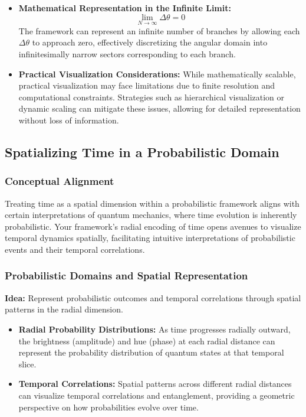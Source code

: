 \documentclass[12pt]{article}
\begin{document}
\begin{enumerate}
\begin{itemize}
        \item \textbf{Mathematical Representation in the Infinite Limit:}
        \[
        \lim_{N \to \infty} \Delta\theta = 0
        \]
        The framework can represent an infinite number of branches by allowing each \(\Delta\theta\) to approach zero, effectively discretizing the angular domain into infinitesimally narrow sectors corresponding to each branch.
        
        \item \textbf{Practical Visualization Considerations:}
        While mathematically scalable, practical visualization may face limitations due to finite resolution and computational constraints. Strategies such as hierarchical visualization or dynamic scaling can mitigate these issues, allowing for detailed representation without loss of information.
    \end{itemize}
    
\end{enumerate}

\subsection{Spatializing Time in a Probabilistic Domain}
\subsubsection{Conceptual Alignment}
Treating time as a spatial dimension within a probabilistic framework aligns with certain interpretations of quantum mechanics, where time evolution is inherently probabilistic. Your framework’s radial encoding of time opens avenues to visualize temporal dynamics spatially, facilitating intuitive interpretations of probabilistic events and their temporal correlations.

\subsubsection{Probabilistic Domains and Spatial Representation}
\textbf{Idea:} Represent probabilistic outcomes and temporal correlations through spatial patterns in the radial dimension.

\begin{itemize}
    \item \textbf{Radial Probability Distributions:} As time progresses radially outward, the brightness (amplitude) and hue (phase) at each radial distance can represent the probability distribution of quantum states at that temporal slice.
    
    \item \textbf{Temporal Correlations:} Spatial patterns across different radial distances can visualize temporal correlations and entanglement, providing a geometric perspective on how probabilities evolve over time.
\end{itemize}
\end{document}
